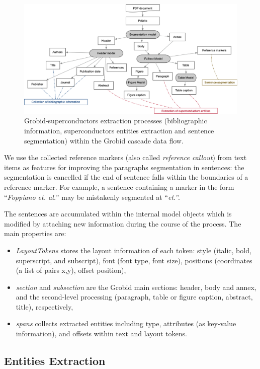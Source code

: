 \documentclass{article}
\begin{document}
\begin{figure}[ht]
\label{fig:grobid-document-processing}
\includegraphics[width=\textwidth]{grobid-extraction-2}
\caption{Grobid-superconductors extraction processes (bibliographic information, superconductors entities extraction and sentence segmentation) within the Grobid cascade data flow.}
\end{figure}

We use the collected reference markers (also called \textit{reference callout}) from text items as features for improving the paragraphs segmentation in sentences: the segmentation is cancelled if the end of sentence falls within the boundaries of a reference marker. 
For example, a sentence containing a marker in the form ``\textit{Foppiano et. al.}'' may be mistakenly segmented at ``\textit{et.}''.

The sentences are accumulated within the internal model objects which is modified by attaching new information during the course of the process. 
The main properties are: 
\begin{itemize}
    \item \textit{LayoutTokens} stores the layout information of each token: style (italic, bold, superscript, and subscript), font (font type, font size), positions (coordinates (a list of pairs x,y), offset position), 
    \item \textit{section} and \textit{subsection} are the Grobid main sections: header, body and annex, and the second-level processing (paragraph, table or figure caption, abstract, title), respectively,
    \item \textit{spans} collects extracted entities including type, attributes (as key-value information), and offsets within text and layout tokens.
\end{itemize}


\subsection{Entities Extraction}
\label{subsubsec:extraction}
\end{document}

